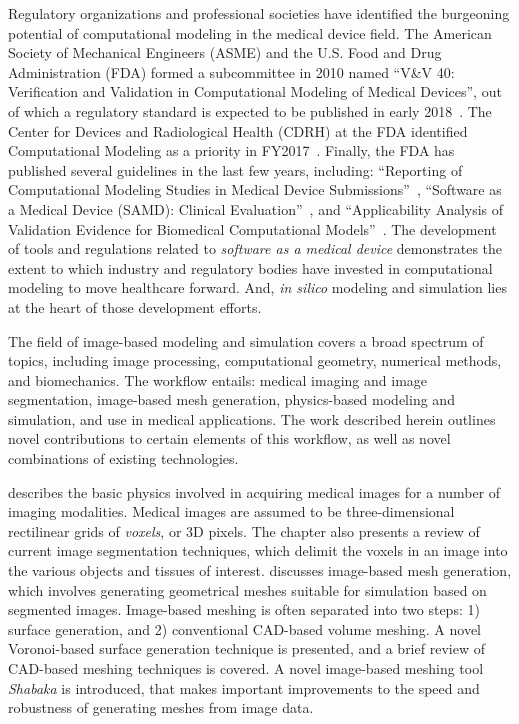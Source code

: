 Regulatory organizations and professional societies have identified the burgeoning potential of computational modeling in the medical device field. The American Society of Mechanical Engineers (ASME) and the U.S. Food and Drug Administration (FDA) formed a subcommittee in 2010 named ``V\&V 40: Verification and Validation in Computational Modeling of Medical Devices'', out of which a regulatory standard is expected to be published in early 2018~\cite{committee}. The Center for Devices and Radiological Health (CDRH) at the FDA identified Computational Modeling as a priority in FY2017~\cite{Morrison2017}. Finally, the FDA has published several guidelines in the last few years, including: ``Reporting of Computational Modeling Studies in Medical Device Submissions''~\cite{fda1_2016}, ``Software as a Medical Device (SAMD): Clinical Evaluation''~\cite{fda1_2016}, and ``Applicability Analysis of Validation Evidence for Biomedical Computational Models''~\cite{pathmanathan_2017}. The development of tools and regulations related to \textit{software as a medical device} demonstrates the extent to which industry and regulatory bodies have invested in computational modeling to move healthcare forward. And, \textit{in silico} modeling and simulation lies at the heart of those development efforts.


The field of image-based modeling and simulation covers a broad spectrum of topics, including image processing, computational geometry, numerical methods, and biomechanics. The workflow entails: medical imaging and image segmentation, image-based mesh generation, physics-based modeling and simulation, and use in medical applications. The work described herein outlines novel contributions to certain elements of this workflow, as well as novel combinations of existing technologies.

 describes the basic physics involved in acquiring medical images for a number of imaging modalities. Medical images are assumed to be three-dimensional rectilinear grids of \textit{voxels}, or 3D pixels. The chapter also presents a review of current image segmentation techniques, which delimit the voxels in an image into the various objects and tissues of interest.  discusses image-based mesh generation, which involves generating geometrical meshes suitable for simulation based on segmented images. Image-based meshing is often separated into two steps: 1) surface generation,  and 2) conventional CAD-based volume meshing. A novel Voronoi-based surface generation technique is presented, and a brief review of CAD-based meshing techniques is covered. A novel image-based meshing tool \textit{Shabaka} is introduced, that makes important improvements to the speed and robustness of generating meshes from image data.

